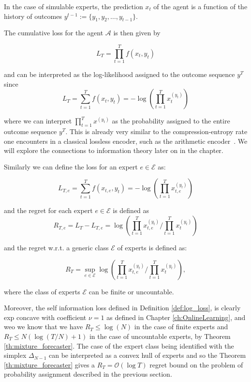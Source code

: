 In the case of simulable experts, the prediction $x_t$ of the agent is a function of the history of outcomes $y^{t-1}:=\{y_1,y_2,\ldots,y_{t-1}\}$.

The cumulative loss for the agent $\mathcal A$ is then given by 

\begin{equation}
L_T=\prod\limits_{t=1}^T f(x_t,y_t)
\end{equation}

and can be interpreted as the log-likelihood assigned to the outcome sequence $y^T$ since 
\begin{equation}\label{eq:loss_log}
L_T=\sum\limits_{t=1}^Tf(x_t,y_t)=-\log\left(\prod\limits_{t=1}^Tx_t^{(y_t)}\right)
\end{equation}

where we can interpret $\prod\limits_{t=1}^Tx^{(y_t)}$ as the probability assigned to the entire outcome sequence $y^T$. This is already very similar to the compression-entropy rate one encounters in a classical lossless encoder, such as the arithmetic encoder~\cite{langdon1984introduction}. We will explore the connections to information theory later on in the chapter. 

Similarly we can define the loss for an expert $e\in\mathcal E$ as: 

\begin{equation}
L_{T,e}=\sum\limits_{t=1}^Tf(x_{t,e},y_t)=-\log\left(\prod\limits_{t=1}^Tx_{t,e}^{(y_t)}\right)
\end{equation}

and the regret for each expert $e\in\mathcal E$ is defined as 
\begin{equation}
R_{T,e}=L_T-L_{T,e}=\log\left(\prod\limits_{t=1}^Tx_{t,e}^{(y_t)}\bigg/\prod\limits_{t=1}^Tx_t^{(y_t)}\right)
\end{equation}

and the regret w.r.t. a generic class $\mathcal E$ of experts is defined as: 

\begin{equation}
R_{T}=\sup\limits_{e\in\mathcal E}\log\left(\prod\limits_{t=1}^Tx_{t,e}^{(y_t)}\bigg/\prod\limits_{t=1}^Tx_t^{(y_t)}\right),
\end{equation}

where the class of experts $\mathcal E$ can be finite or uncountable.

Moreover, the self information loss defined in Definition \ref{def:log_loss}, is clearly exp concave with coefficient $\nu=1$ as defined in Chapter \ref{ch:OnlineLearning}, and weo we know that we have $R_T\le\log(N)$ in the case of finite experts and $R_T\le N(\log(T/N)+1)$ in the case of uncountable experts, by Theorem \ref{th:mixture_forecaster}. The case of the expert class being identified with the simplex $\Delta_{N-1}$ can be interpreted as a convex hull of experts and so the Theorem \ref{th:mixture_forecaster} gives a $R_T=\mathcal O(\log T)$ regret bound on the problem of probability assignment described in the previous section.


